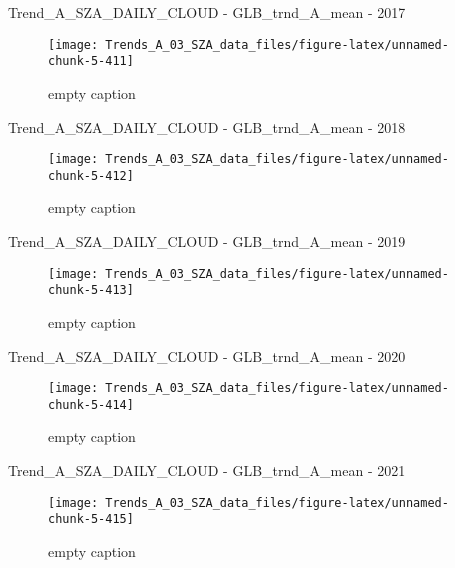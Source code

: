 \documentclass[
  10pt,
  a4paper,oneside]{article}
\begin{document}
Trend\_A\_SZA\_DAILY\_CLOUD - GLB\_trnd\_A\_mean - 2017

\begin{figure}[!ht]

{\centering \texttt{[image: Trends\_A\_03\_SZA\_data\_files/figure-latex/unnamed-chunk-5-411]} 

}

\caption{ empty caption }\label{fig:unnamed-chunk-5-411}
\end{figure}

Trend\_A\_SZA\_DAILY\_CLOUD - GLB\_trnd\_A\_mean - 2018

\begin{figure}[!ht]

{\centering \texttt{[image: Trends\_A\_03\_SZA\_data\_files/figure-latex/unnamed-chunk-5-412]} 

}

\caption{ empty caption }\label{fig:unnamed-chunk-5-412}
\end{figure}

Trend\_A\_SZA\_DAILY\_CLOUD - GLB\_trnd\_A\_mean - 2019

\begin{figure}[!ht]

{\centering \texttt{[image: Trends\_A\_03\_SZA\_data\_files/figure-latex/unnamed-chunk-5-413]} 

}

\caption{ empty caption }\label{fig:unnamed-chunk-5-413}
\end{figure}

Trend\_A\_SZA\_DAILY\_CLOUD - GLB\_trnd\_A\_mean - 2020

\begin{figure}[!ht]

{\centering \texttt{[image: Trends\_A\_03\_SZA\_data\_files/figure-latex/unnamed-chunk-5-414]} 

}

\caption{ empty caption }\label{fig:unnamed-chunk-5-414}
\end{figure}

Trend\_A\_SZA\_DAILY\_CLOUD - GLB\_trnd\_A\_mean - 2021

\begin{figure}[!ht]

{\centering \texttt{[image: Trends\_A\_03\_SZA\_data\_files/figure-latex/unnamed-chunk-5-415]} 

}

\caption{ empty caption }\label{fig:unnamed-chunk-5-415}
\end{figure}
\end{document}
